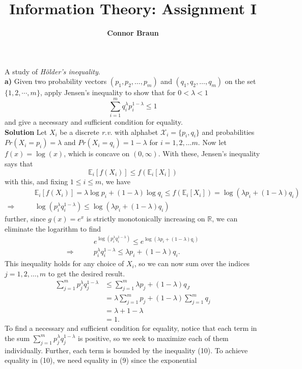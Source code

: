 \documentclass[11pt, letterpaper]{article}
\title{\bf Information Theory: Assignment I}
\author{\bf Connor Braun}
\date{}
\newcommand{\mbb}[1]{\mathbb{#1}}
\newcommand{\mc}[1]{\mathcal{#1}}
\begin{document}
\maketitle
{} A study of {\it H\"older's inequality}.\\[10pt]
{\bf a)} Given two probability vectors $(p_1,p_2,\dots,p_m)$ and $(q_1,q_2,\dots,q_m)$ on the set $\{1,2,\cdots,m\}$, apply Jensen's inequality to
show that for $0<\lambda<1$
\[\sum_{i=1}^mq_i^\lambda p_i^{1-\lambda}\leq 1\]
and give a necessary and sufficient condition for equality.\\[10pt]
{\bf Solution} Let $X_i$ be a discrete {\it r.v.} with alphabet $\mc{X}_i=\{p_i,q_i\}$ and probabilities
$Pr(X_i=p_i)=\lambda$ and $Pr(X_i=q_i)=1-\lambda$ for $i=1,2,\dots m$. Now let $f(x)=\log(x)$, which is concave on
$(0,\infty)$. With these, Jensen's inequality says that
\[\mbb{E}_i[f(X_i)]\leq f(\mbb{E}_i[X_i])\]
with this, and fixing $1\leq i\leq m$, we have
\begin{align*}
    &\mbb{E}_i[f(X_i)]=\lambda\log p_i+(1-\lambda)\log q_i\leq f(\mbb{E}_i[X_i])=\log(\lambda p_i + (1-\lambda)q_i)\\
   \Rightarrow\qquad &\log(p_i^\lambda q_i^{1-\lambda})\leq\log(\lambda p_i+(1-\lambda)q_i)\tag{9}
\end{align*}
further, since $g(x)=e^x$ is strictly monotonically increasing on $\mbb{R}$, we can eliminate the logarithm to find
\begin{align*}
    &e^{\log(p_i^\lambda q_i^{1-\lambda})}\leq e^{\log(\lambda p_i+(1-\lambda)q_i)}\\
    \Rightarrow\qquad&p_i^\lambda q_i^{1-\lambda}\leq\lambda p_i+(1-\lambda)q_i.\tag{10}
\end{align*}
This inequality holds for any choice of $X_i$, so we can now sum over the indices $j=1,2,\dots,m$ to get the desired result.
\begin{align*}
    \sum_{j=1}^mp_j^\lambda q_j^{1-\lambda}&\leq\sum_{j=1}^m\lambda p_j+(1-\lambda)q_J\\
    &=\lambda\sum_{j=1}^mp_j+(1-\lambda)\sum_{j=1}^mq_j\\
    &=\lambda+1-\lambda\\
    &=1.
\end{align*}
To find a necessary and sufficient condition for equality, notice that each term in the sum $\sum_{j=1}^mp_j^\lambda q_j^{1-\lambda}$ is positive, so we
seek to maximize each of them individually. Further, each term is bounded by the inequality (10). To achieve equality in (10), we need equality in (9) since the exponential
\end{document}
